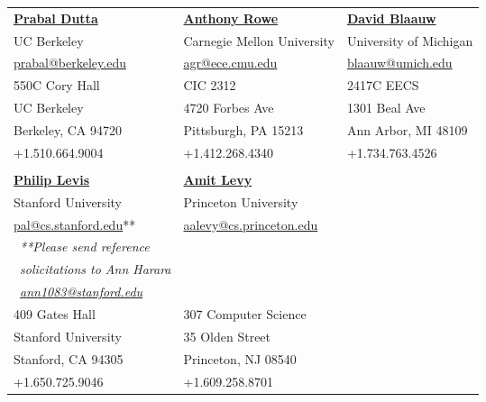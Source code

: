 \documentclass{article}
\begin{document}
\begin{tabularx}{\textwidth}{X X X}
  \textbf{\href{https://people.eecs.berkeley.edu/~prabal/}{Prabal Dutta}} &
  \textbf{\href{https://users.ece.cmu.edu/~agr/}{Anthony Rowe}}           &
  \textbf{\href{https://blaauw.engin.umich.edu/}{David Blaauw}}           \\
  UC Berkeley           & Carnegie Mellon University & University of Michigan  \\
  \href{mailto:prabal@berkeley.edu}{prabal@berkeley.edu}   &
  \href{mailto:agr@ece.cmu.edu}{agr@ece.cmu.edu}           &
  \href{mailto:blaauw@umich.edu}{blaauw@umich.edu}         \\[.5em]
  550C Cory Hall        & CIC 2312                   & 2417C EECS              \\
  UC Berkeley           & 4720 Forbes Ave            & 1301 Beal Ave           \\
  Berkeley, CA 94720    & Pittsburgh, PA 15213       & Ann Arbor, MI 48109     \\
  +1.510.664.9004       & +1.412.268.4340            & +1.734.763.4526         \\
  \\
  \textbf{\href{http://csl.stanford.edu/~pal/}{Philip Levis}} &
  \textbf{\href{https://amitlevy.com/}{Amit Levy}}            \\
  Stanford University   & Princeton University       \\
  \href{mailto:pal@cs.stanford.edu}{pal@cs.stanford.edu}**          &
  \href{mailto:aalevy@cs.princeton.edu}{aalevy@cs.princeton.edu}    \\
  ~\emph{**Please send reference}\\
  ~\emph{solicitations to Ann Harara}\\
  ~\emph{\href{mailto:ann1083@stanford.edu}{ann1083@stanford.edu}}\\[.5em]
  409 Gates Hall        & 307 Computer Science       \\
  Stanford University   & 35 Olden Street            \\
  Stanford, CA 94305    & Princeton, NJ 08540        \\
  +1.650.725.9046       & +1.609.258.8701            \\
\end{tabularx}
\end{document}
